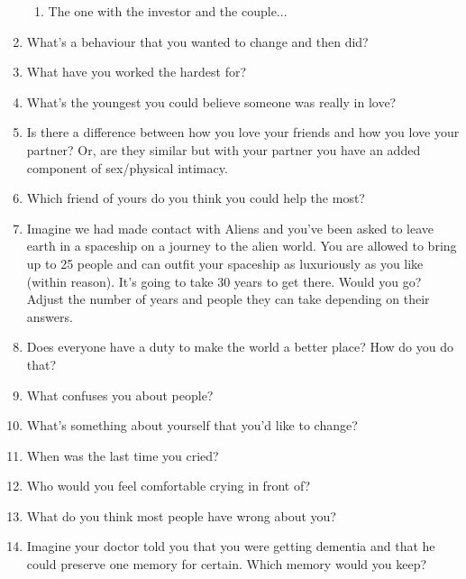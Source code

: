\documentclass[11pt]{article}
\begin{document}
\begin{enumerate}
\begin{enumerate}
			\item The one with the investor and the couple...
		\end{enumerate}

	\item What's a behaviour that you wanted to change and then did?
	\item What have you worked the hardest for?
	\item What's the youngest you could believe someone was really in love?
	\item Is there a difference between how you love your friends and how you love your partner? Or, are they similar but 
		with your partner you have an added component of sex/physical intimacy.
	\item Which friend of yours do you think you could help the most?
	\item Imagine we had made contact with Aliens and you've been asked to leave earth in a spaceship on a journey to the alien 
		world. You are allowed to bring up to 25 people and can outfit your spaceship as luxuriously as you like (within reason).
		It's going to take 30 years to get there. Would you go? Adjust the number of years and people they can take depending on 
		their answers.
	\item Does everyone have a duty to make the world a better place? How do you do that?
	\item What confuses you about people?
	\item What's something about yourself that you'd like to change?
	\item When was the last time you cried?
	\item Who would you feel comfortable crying in front of?
	\item What do you think most people have wrong about you?
	\item Imagine your doctor told you that you were getting dementia and that he could preserve one memory for certain.
		Which memory would you keep?



	





\end{enumerate}
\end{document}

